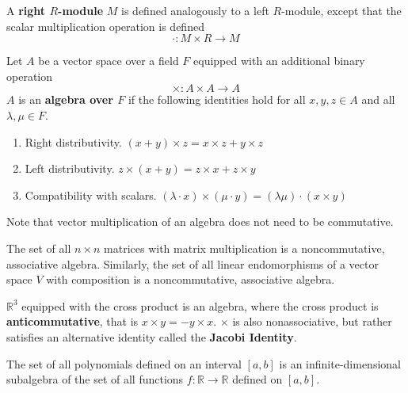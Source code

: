 \documentclass{article}
\begin{document}
    \begin{definition}
      A \textbf{right $R$-module} $M$ is defined analogously to a left $R$-module, except that the scalar multiplication operation is defined
      \begin{equation}
        \cdot: M \times R \longrightarrow M
      \end{equation}
    \end{definition}

    \begin{definition}
      Let $A$ be a vector space over a field $F$ equipped with an additional binary operation 
      \begin{equation}
        \times: A \times A \longrightarrow A
      \end{equation}
      $A$ is an \textbf{algebra over $F$} if the following identities hold for all $x, y, z \in A$ and all $\lambda, \mu \in F$. 
      \begin{enumerate}
        \item Right distributivity. $(x + y) \times z = x \times z + y \times z$ 
        \item Left distributivity. $z \times (x + y) = z \times x + z \times y$
        \item Compatibility with scalars. $(\lambda \cdot x ) \times (\mu \cdot y) = (\lambda \mu) \cdot (x \times y)$ 
      \end{enumerate}
    \end{definition}

    Note that vector multiplication of an algebra does not need to be commutative. 

    \begin{example}
      The set of all $n \times n$ matrices with matrix multiplication is a noncommutative, associative algebra. Similarly, the set of all linear endomorphisms of a vector space $V$ with composition is a noncommutative, associative algebra. 
    \end{example}

    \begin{example}
      $\mathbb{R}^3$ equipped with the cross product is an algebra, where the cross product is \textbf{anticommutative}, that is $x \times y = - y \times x$. $\times$ is also nonassociative, but rather satisfies an alternative identity called the \textbf{Jacobi Identity}. 
    \end{example}

    \begin{example}
      The set of all polynomials defined on an interval $[a,b]$ is an infinite-dimensional subalgebra of the set of all functions $f: \mathbb{R} \longrightarrow \mathbb{R}$ defined on $[a,b]$.
    \end{example}
\end{document}
